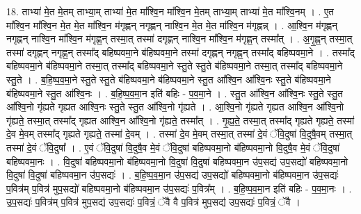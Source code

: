 \documentclass[17pt]{extarticle}
\begin{document}
18. ताभ्या॑ मे॒त मे॒तम् ताभ्या॒म् ताभ्या॑ मे॒त मा᳚श्वि॒न मा᳚श्वि॒न मे॒तम् ताभ्या॒म् ताभ्या॑ मे॒त मा᳚श्वि॒नम् । . ए॒त मा᳚श्वि॒न मा᳚श्वि॒न मे॒त मे॒त मा᳚श्वि॒न म॑गृह्णन् नगृह्णन् नाश्वि॒न मे॒त मे॒त मा᳚श्वि॒न म॑गृह्णन्न् । . आ॒श्वि॒न म॑गृह्णन् नगृह्णन् नाश्वि॒न मा᳚श्वि॒न म॑गृह्ण॒न् तस्मा॒त् तस्मा॑ दगृह्णन् नाश्वि॒न मा᳚श्वि॒न म॑गृह्ण॒न् तस्मा᳚त् । . अ॒गृ॒ह्ण॒न् तस्मा॒त् तस्मा॑ दगृह्णन् नगृह्ण॒न् तस्मा᳚द् बहिष्पवमा॒ने ब॑हिष्पवमा॒ने तस्मा॑ दगृह्णन् नगृह्ण॒न् तस्मा᳚द् बहिष्पवमा॒ने । . तस्मा᳚द् बहिष्पवमा॒ने ब॑हिष्पवमा॒ने तस्मा॒त् तस्मा᳚द् बहिष्पवमा॒ने स्तु॒ते स्तु॒ते ब॑हिष्पवमा॒ने तस्मा॒त् तस्मा᳚द् बहिष्पवमा॒ने स्तु॒ते । . ब॒हि॒ष्प॒व॒मा॒ने स्तु॒ते स्तु॒ते ब॑हिष्पवमा॒ने ब॑हिष्पवमा॒ने स्तु॒त आ᳚श्वि॒न आ᳚श्वि॒नः स्तु॒ते ब॑हिष्पवमा॒ने ब॑हिष्पवमा॒ने स्तु॒त आ᳚श्वि॒नः । . ब॒हि॒ष्प॒व॒मा॒न इति॑ बहिः - प॒व॒मा॒ने । . स्तु॒त आ᳚श्वि॒न आ᳚श्वि॒नः स्तु॒ते स्तु॒त आ᳚श्वि॒नो गृ॑ह्यते गृह्यत आश्वि॒नः स्तु॒ते स्तु॒त आ᳚श्वि॒नो गृ॑ह्यते । . आ॒श्वि॒नो गृ॑ह्यते गृह्यत आश्वि॒न आ᳚श्वि॒नो गृ॑ह्यते॒ तस्मा॒त् तस्मा᳚द् गृह्यत आश्वि॒न आ᳚श्वि॒नो गृ॑ह्यते॒ तस्मा᳚त् । . गृ॒ह्य॒ते॒ तस्मा॒त् तस्मा᳚द् गृह्यते गृह्यते॒ तस्मा॑ दे॒व मे॒वम् तस्मा᳚द् गृह्यते गृह्यते॒ तस्मा॑ दे॒वम् । . तस्मा॑ दे॒व मे॒वम् तस्मा॒त् तस्मा॑ दे॒वं ॅवि॒दुषा॑ वि॒दुषै॒वम् तस्मा॒त् तस्मा॑ दे॒वं ॅवि॒दुषा᳚ । . ए॒वं ॅवि॒दुषा॑ वि॒दुषै॒व मे॒वं ॅवि॒दुषा॑ बहिष्पवमा॒नो ब॑हिष्पवमा॒नो वि॒दुषै॒व मे॒वं ॅवि॒दुषा॑ बहिष्पवमा॒नः । . वि॒दुषा॑ बहिष्पवमा॒नो ब॑हिष्पवमा॒नो वि॒दुषा॑ वि॒दुषा॑ बहिष्पवमा॒न उ॑प॒सद्य॑ उप॒सद्यो॑ बहिष्पवमा॒नो वि॒दुषा॑ वि॒दुषा॑ बहिष्पवमा॒न उ॑प॒सद्यः॑ । . ब॒हि॒ष्प॒व॒मा॒न उ॑प॒सद्य॑ उप॒सद्यो॑ बहिष्पवमा॒नो ब॑हिष्पवमा॒न उ॑प॒सद्यः॑ प॒वित्र॑म् प॒वित्र॑ मुप॒सद्यो॑ बहिष्पवमा॒नो ब॑हिष्पवमा॒न उ॑प॒सद्यः॑ प॒वित्र᳚म् । . ब॒हि॒ष्प॒व॒मा॒न इति॑ बहिः - प॒व॒मा॒नः । . उ॒प॒सद्यः॑ प॒वित्र॑म् प॒वित्र॑ मुप॒सद्य॑ उप॒सद्यः॑ प॒वित्रं॒ ॅवै वै प॒वित्र॑ मुप॒सद्य॑ उप॒सद्यः॑ प॒वित्रं॒ ॅवै । \newline
\end{document}
